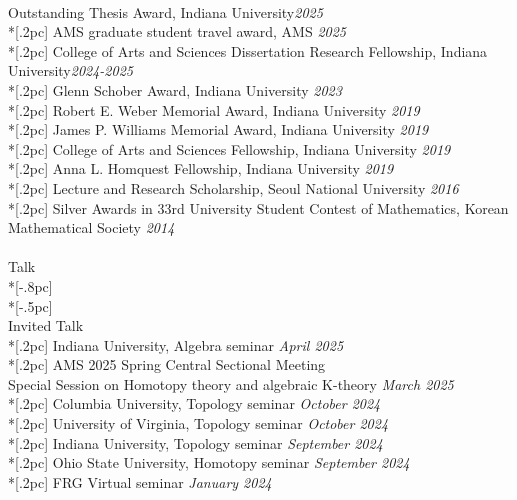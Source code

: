 \documentclass{article}
\begin{document}
\\
{ Outstanding Thesis Award},  Indiana University\hfill {\it  2025\/} \\*[.2pc]
{ AMS graduate student travel award}, AMS \hfill {\it 2025\/} \\*[.2pc]
{ College of Arts and Sciences Dissertation Research Fellowship}, Indiana University\hfill {\it 2024-2025\/} \\*[.2pc]
{ Glenn Schober Award}, Indiana University \hfill {\it  2023\/} \\*[.2pc]
{ Robert E. Weber Memorial Award}, Indiana University \hfill {\it  2019\/} \\*[.2pc]
{ James P. Williams Memorial Award}, Indiana University \hfill {\it  2019\/} \\*[.2pc]
{ College of Arts and Sciences Fellowship}, Indiana University \hfill {\it  2019\/} \\*[.2pc]
{ Anna L. Homquest Fellowship}, Indiana University \hfill {\it  2019\/} \\*[.2pc]
{ Lecture and Research Scholarship}, Seoul National University \hfill {\it  2016\/} \\*[.2pc]
{ Silver Awards in 33rd University Student Contest of Mathematics}, Korean Mathematical Society \hfill {\it  2014\/}  \\
\\
{\Large  Talk} \\*[-.8pc]
\underline{\hspace{6.5in}} \\*[-.5pc]
\\
{  \large Invited Talk} \\*[.2pc]
{ Indiana University, Algebra seminar} \hfill {\it April 2025\/}  \\*[.2pc]
{  AMS 2025 Spring Central Sectional Meeting \\ \hspace*{1em} Special Session on Homotopy theory and algebraic K-theory} \hfill {\it March 2025\/}  \\*[.2pc]
{  Columbia University, Topology seminar} \hfill {\it October 2024\/}  \\*[.2pc]
{  University of Virginia, Topology seminar} \hfill {\it October 2024\/}  \\*[.2pc]
{ Indiana University, Topology seminar} \hfill {\it September 2024\/}  \\*[.2pc]
{ Ohio State University, Homotopy seminar} \hfill {\it September 2024\/}  \\*[.2pc]
{ FRG Virtual seminar} \hfill {\it January 2024\/}  \\
\end{document}
